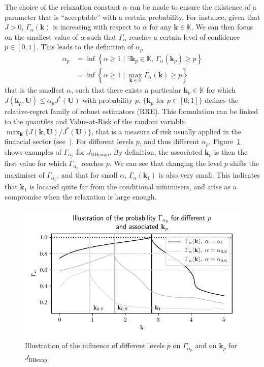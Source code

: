 \documentclass[preprint, 1p]{elsarticle}
\newcommand{\RRE}{RRE}
\newcommand{\checkap}{{\alpha}_p}
\newcommand{\checkkp}{{\mathbf{k}}_p}
\newcommand{\Kspace}{\mathbb{K}}
\newcommand{\JBHS}{J_{\mathrm{BHswap}}}
\newlength{\singlecolumnsize}
\begin{document}
The choice of the relaxation constant $\alpha$ can be made to ensure the existence of a parameter that is ``acceptable'' with a certain probability.
For instance, given that $J>0$, $\Gamma_{\alpha}(\mathbf{k})$ is increasing with respect to $\alpha$ for any $\mathbf{k}\in\Kspace$. We can then focus on the smallest value of $\alpha$ such that $\Gamma_\alpha$ reaches a certain level of confidence $p\in[0,1]$. This leads to the definition of $\checkap$
\begin{align}
  \checkap &= \inf\left\{ \alpha\geq 1 \mid \exists \checkkp \in \Kspace,\, \Gamma_{\alpha}(\checkkp) \geq p \right\} \nonumber \\
   &= \inf \left\{ \alpha \geq 1 \mid \max_{\mathbf{k}\in\Kspace} \Gamma_{\alpha}(\mathbf{k}) \geq p \right\}   \label{eq:def_alpha_check}
\end{align}
that is the smallest $\alpha$, such that there exists a particular $\checkkp \in \Kspace$ for which $J(\checkkp,\mathbf{U}) \leq \checkap J^*(\mathbf{U})$ with probability $p$.
$\{\mathbf{k}_p \text{ for } p \in [0;1] \}$ defines the relative-regret family of robust estimators (\RRE).
This formulation can be linked to the quantiles and Value-at-Risk of the random variable $\max_{\mathbf{k}} \{ J(\mathbf{k},\mathbf{U}) / J^*(\mathbf{U})\}$, that is a measure of risk usually applied in the financial sector (see~\cite{rockafellar_deviation_2002}). For different levels $p$, and thus different $\alpha_p$, Figure~\ref{fig:illu_alpha_p} shows examples of $\Gamma_{\alpha_p}$ for $\JBHS$. By definition, the associated $\mathbf{k}_p$ is then the first value for which $\Gamma_{\alpha_p}$ reaches $p$. We can see that changing the level $p$ shifts the maximiser of $\Gamma_{\alpha_p}$, and that for small $\alpha$, $\Gamma_{\alpha}(\mathbf{k}_1)$ is also very small. This indicates that $\mathbf{k}_1$ is located quite far from the conditional minimisers, and arise as a compromise when the relaxation is large enough.

\begin{figure}[!ht]
\centering
\includegraphics[width = \singlecolumnsize]{Figures/FIG04.pdf}
\caption{Illustration of the influence of different levels $p$ on $\Gamma_{\alpha_p}$ and on $\mathbf{k}_p$ for $\JBHS$}
\label{fig:illu_alpha_p}
\end{figure}
\end{document}
